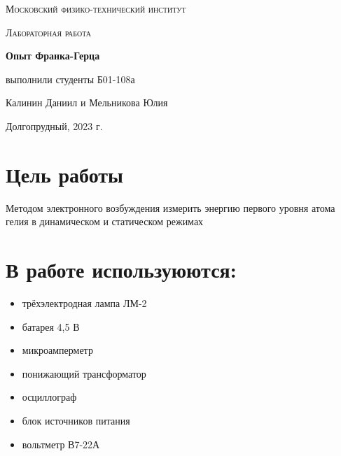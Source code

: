 \documentclass[a4paper, 12pt]{article}
\begin{document}
\begin{titlepage}
	\centering
	\vspace{5cm}
	{\scshape\LARGE Московский физико-технический институт \par}
	\vspace{4cm}
	{\scshape\Large Лабораторная работа \par}
	\vspace{1cm}
	{\huge\bfseries Опыт Франка-Герца \par}
	\vspace{1cm}
	\vfill
\begin{flushright}
	{\large выполнили студенты Б01-108а}\par
	\vspace{0.3cm}
	{\LARGE Калинин Даниил и Мельникова Юлия} \par

\end{flushright}
	

	\vfill

	Долгопрудный, 2023 г.
\end{titlepage}

\section{Цель работы}
Методом электронного возбуждения измерить энергию первого уровня атома гелия в динамическом и статическом режимах

\section{В работе используюются:}
\begin{itemize}
    \item трёхэлектродная лампа ЛМ-2
    \item батарея 4,5 В
    \item микроамперметр
    \item понижающий трансформатор
    \item осциллограф
    \item блок источников питания
    \item вольтметр В7-22А
\end{itemize}
\end{document}
